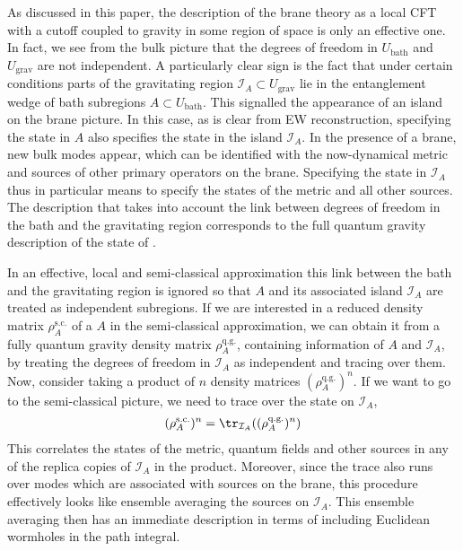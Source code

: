 As discussed in this paper, the description of the brane theory as a local CFT with a cutoff coupled to gravity in some region of space is only an effective one. In fact, we see from the bulk picture that the degrees of freedom in $U_\text{bath}$ and $U_\text{grav}$ are not independent. A particularly clear sign is the fact that under certain conditions parts of the gravitating region $\mathcal I_A \subset U_\text{grav}$ lie in the entanglement wedge of bath subregions $A \subset U_\text{bath}$. This signalled the appearance of an island on the brane picture. In this case, as is clear from EW reconstruction, specifying the state in $A$ also specifies the state in the island $\mathcal I_A$. In the presence of a brane, new bulk modes appear, which can be identified with the now-dynamical metric and sources of other primary operators on the brane. Specifying the state in $\mathcal I_A$ thus in particular means to specify the states of the metric and all other sources. The description that takes into account the link between degrees of freedom in the bath and the gravitating region corresponds to the full quantum gravity description of the state of \cite{Almheiri:2019yqk}.

In an effective, local and semi-classical approximation this link between the bath and the gravitating region is ignored so that $A$ and its associated island $\mathcal I_A$ are treated as independent subregions. If we are interested in a reduced density matrix $\rho^\text{s.c.}_A$ of a $A$ in the semi-classical approximation, we can obtain it from a fully quantum gravity density matrix $\rho^\text{q.g.}_A$, containing information of $A$ and $\mathcal I_A$, by treating the degrees of freedom in $\mathcal I_A$ as independent and tracing over them. Now, consider taking a product of $n$ density matrices $(\rho^\text{q.g.}_A)^n$. If we want to go to the semi-classical picture, we need to trace over the state on $\mathcal I_A$,
\begin{align}
(\rho^\text{s.c.}_A)^n = \tr_{\mathcal I_A}((\rho^\text{q.g.}_A)^n)
\end{align}
This correlates the states of the metric, quantum fields and other sources in any of the replica copies of $\mathcal I_A$ in the product. Moreover, since the trace also runs over modes which are associated with sources on the brane, this procedure effectively looks like ensemble averaging the sources on $\mathcal I_A$. This ensemble averaging then has an immediate description in terms of including Euclidean wormholes in the path integral.\\
